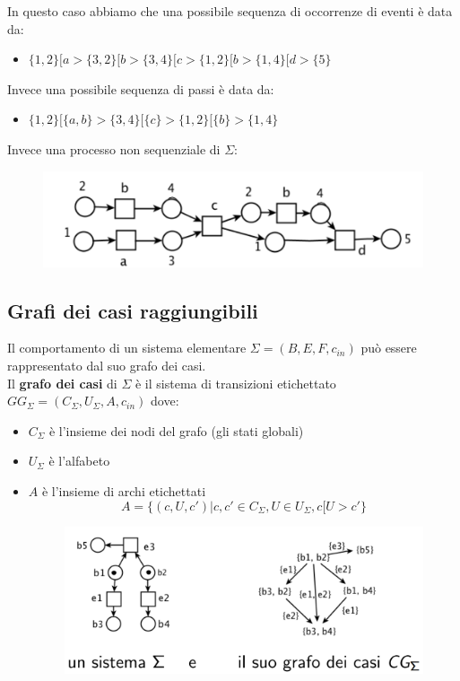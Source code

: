 In questo caso abbiamo che una possibile sequenza di occorrenze di eventi è data da:
\begin{itemize}
    \item $\{1,2\}[a> \{3,2\}[b > \{3,4\}[c>\{1,2\}[b> \{1,4\}[d>\{5\}$
\end{itemize}
Invece una possibile sequenza di passi è data da:
\begin{itemize}
    \item $\{1,2\}[\{a,b\} > \{3,4\}[\{c\} > \{1,2\}[\{b\}> \{1,4\}$
\end{itemize}
Invece una processo non sequenziale di $\Sigma$:
\begin{figure}[H]
    \centering
    \includegraphics[scale = .5]{IMM/seq_immag_1.PNG}
\end{figure}

\subsection{Grafi dei casi raggiungibili}
Il comportamento di un sistema elementare $\Sigma = (B,E,F, c_{in})$ può essere rappresentato dal suo grafo dei casi. \\
Il \textbf{grafo dei casi} di $\Sigma$ è il sistema di transizioni etichettato $GG_{\Sigma}  = (C_{\Sigma},U_{\Sigma}, A, c_{in})$ dove:
\begin{itemize}
    \item $C_{\Sigma}$ è l'insieme dei nodi del grafo (gli stati globali)
    \item $U_{\Sigma}$ è l’alfabeto
    \item $A$ è l'insieme di archi etichettati 
    \[A = \{(c, U, c')| c, c' \in C_{\Sigma}, U \in U_{\Sigma}, c[U > c' \}\]
    \begin{figure}[H]
        \centering
    \includegraphics[scale = .5]{IMM/seq_immag_2.PNG}
\end{figure}
\end{itemize}


